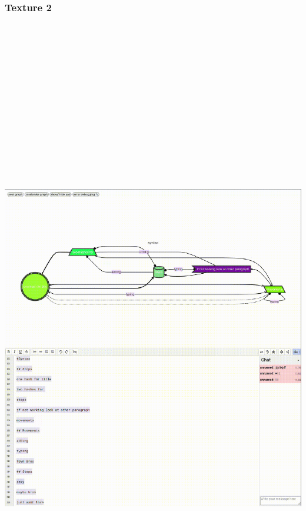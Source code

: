 \hypertarget{texture-2}{%
\subsubsection[Texture
2]{\texorpdfstring{\protect\hypertarget{anchor}{}{}Texture
2}{Texture 2}}\label{texture-2}}

\includegraphics[width=18.69444in,height=20in]{../../Chapters/media_03_Disobedient_Action_Research_Cycles/Pictures/2.png}

